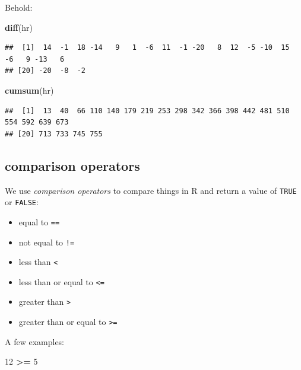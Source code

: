 \documentclass[
]{book}
\newenvironment{Shaded}{\begin{snugshade}}{\end{snugshade}}
\newcommand{\DecValTok}[1]{\textcolor[rgb]{0.00,0.00,0.81}{#1}}
\newcommand{\FunctionTok}[1]{\textcolor[rgb]{0.13,0.29,0.53}{\textbf{#1}}}
\newcommand{\NormalTok}[1]{#1}
\newcommand{\SpecialCharTok}[1]{\textcolor[rgb]{0.81,0.36,0.00}{\textbf{#1}}}
\providecommand{\tightlist}{%
  \setlength{\itemsep}{0pt}\setlength{\parskip}{0pt}}
\theoremstyle{definition}
\theoremstyle{definition}
\theoremstyle{definition}
\theoremstyle{definition}
\theoremstyle{remark}
\begin{document}
Behold:

\begin{Shaded}
\begin{Highlighting}[]
\FunctionTok{diff}\NormalTok{(hr)}
\end{Highlighting}
\end{Shaded}

\begin{verbatim}
##  [1]  14  -1  18 -14   9   1  -6  11  -1 -20   8  12  -5 -10  15  -6   9 -13   6
## [20] -20  -8  -2
\end{verbatim}

\begin{Shaded}
\begin{Highlighting}[]
\FunctionTok{cumsum}\NormalTok{(hr)}
\end{Highlighting}
\end{Shaded}

\begin{verbatim}
##  [1]  13  40  66 110 140 179 219 253 298 342 366 398 442 481 510 554 592 639 673
## [20] 713 733 745 755
\end{verbatim}

\subsection*{comparison operators}\label{comparison-operators}

We use \emph{comparison operators} to compare things in R and return a value of \texttt{TRUE} or \texttt{FALSE}:

\begin{itemize}
\tightlist
\item
  equal to \texttt{==}
\item
  not equal to \texttt{!=}
\item
  less than \texttt{\textless{}}
\item
  less than or equal to \texttt{\textless{}=}
\item
  greater than \texttt{\textgreater{}}
\item
  greater than or equal to \texttt{\textgreater{}=}
\end{itemize}

A few examples:

\begin{Shaded}
\begin{Highlighting}[]
\DecValTok{12} \SpecialCharTok{\textgreater{}=} \DecValTok{5}
\end{Highlighting}
\end{Shaded}
\end{document}
